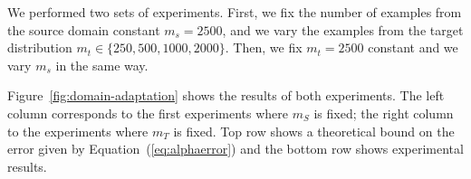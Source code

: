 \documentclass[letterpaper]{article}
\begin{document}
We performed two sets of experiments. First, we fix the number of
examples from the source domain constant $m_s=2500$, and we vary the
examples from the target distribution $m_t \in \{250, 500, 1000,
2000\}$. Then, we fix $m_t=2500$ constant and we vary $m_s$ in the
same way. 

Figure~\ref{fig:domain-adaptation} shows the results of both
experiments. The left column corresponds to the first experiments where
$m_S$ is fixed; the right column to the experiments where $m_T$ is
fixed. Top row shows a theoretical bound on the error given by
Equation~(\ref{eq:alphaerror}) and the bottom row shows experimental
results.

\begin{figure}
  \centering

\end{figure}
\end{document}
